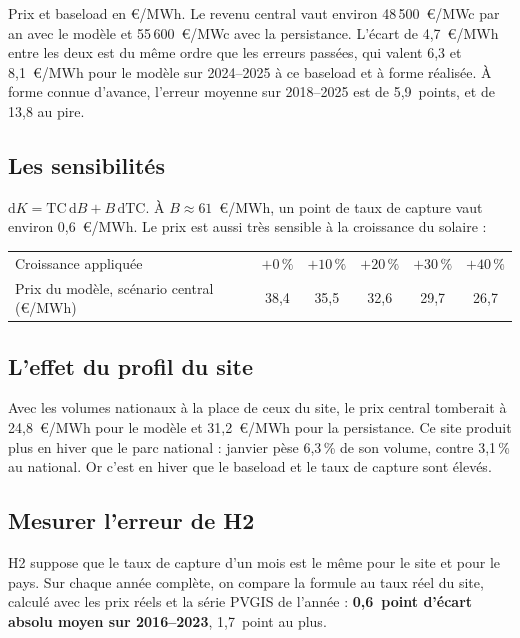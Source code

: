 \documentclass[11pt,a4paper]{article}
\newcommand{\TC}{\mathrm{TC}}
\begin{document}
Prix et baseload en €/MWh. Le revenu central vaut environ 48\,500~€/MWc par an avec le modèle et 55\,600~€/MWc avec la persistance. L'écart de 4,7~€/MWh entre les deux est du même ordre que les erreurs passées, qui valent 6,3 et 8,1~€/MWh pour le modèle sur 2024--2025 à ce baseload et à forme réalisée. À forme connue d'avance, l'erreur moyenne sur 2018--2025 est de 5,9~points, et de 13,8 au pire.

\subsection{Les sensibilités}

$\mathrm{d}K = \TC\,\mathrm{d}B + B\,\mathrm{d}\TC$. À $B \approx 61$~€/MWh, un point de taux de capture vaut environ 0,6~€/MWh. Le prix est aussi très sensible à la croissance du solaire :

\begin{center}
\small
\begin{tabular}{lccccc}
\toprule
Croissance appliquée & $+0\,\%$ & $+10\,\%$ & $+20\,\%$ & $+30\,\%$ & $+40\,\%$ \\
Prix du modèle, scénario central (€/MWh) & 38,4 & 35,5 & 32,6 & 29,7 & 26,7 \\
\bottomrule
\end{tabular}
\end{center}

\subsection{L'effet du profil du site}

Avec les volumes nationaux à la place de ceux du site, le prix central tomberait à 24,8~€/MWh pour le modèle et 31,2~€/MWh pour la persistance. Ce site produit plus en hiver que le parc national : janvier pèse 6,3\,\% de son volume, contre 3,1\,\% au national. Or c'est en hiver que le baseload et le taux de capture sont élevés.

\subsection{Mesurer l'erreur de H2}

H2 suppose que le taux de capture d'un mois est le même pour le site et pour le pays. Sur chaque année complète, on compare la formule au taux réel du site, calculé avec les prix réels et la série PVGIS de l'année : \textbf{0,6~point d'écart absolu moyen sur 2016--2023}, 1,7~point au plus.
\end{document}
